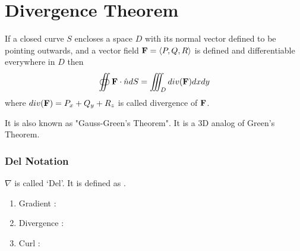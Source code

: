 

\chapter{Divergence Theorem} 

\bigbreak

\begin{mdframed}
\begin{center}
If a closed curve $S$ encloses a space $D$ with its normal vector defined to be pointing outwards,
and a vector field ${\bf F} = \left< P, Q, R \right>$ is defined and differentiable everywhere in $D$ then
$$
\oiint {\bf F} \cdot \hat{n} dS = \iiint_D div({\bf F}) dx dy
$$
where $div({\bf F}) = P_x + Q_y + R_z$ is called divergence of ${\bf F}$.
\end{center}
\end{mdframed}

It is also known as "Gauss-Green's Theorem". It is a 3D analog of Green's Theorem.


\subsection*{Del Notation}

$\nabla$ is called `Del'. It is defined as .
\begin{enumerate}
    \item Gradient : 
    \item Divergence : 
    \item Curl : 
\end{enumerate}


